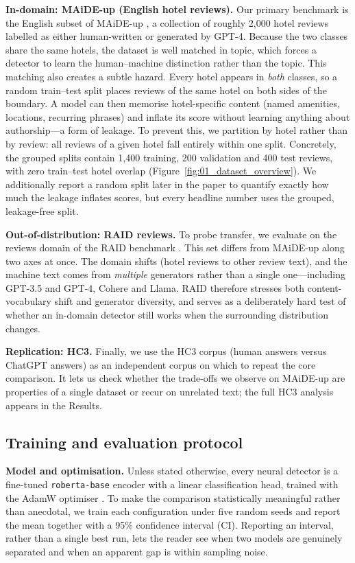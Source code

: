 \documentclass[10pt,twocolumn]{article}
\begin{document}
\textbf{In-domain: MAiDE-up (English hotel reviews).} Our primary benchmark is the English subset of MAiDE-up \cite{maideup}, a collection of roughly 2{,}000 hotel reviews labelled as either human-written or generated by GPT-4. Because the two classes share the same hotels, the dataset is well matched in topic, which forces a detector to learn the human--machine distinction rather than the topic. This matching also creates a subtle hazard. Every hotel appears in \emph{both} classes, so a random train--test split places reviews of the same hotel on both sides of the boundary. A model can then memorise hotel-specific content (named amenities, locations, recurring phrases) and inflate its score without learning anything about authorship---a form of leakage. To prevent this, we partition by hotel rather than by review: all reviews of a given hotel fall entirely within one split. Concretely, the grouped splits contain 1{,}400 training, 200 validation and 400 test reviews, with zero train--test hotel overlap (Figure~\ref{fig:01_dataset_overview}). We additionally report a random split later in the paper to quantify exactly how much the leakage inflates scores, but every headline number uses the grouped, leakage-free split.

\textbf{Out-of-distribution: RAID reviews.} To probe transfer, we evaluate on the reviews domain of the RAID benchmark \cite{raid}. This set differs from MAiDE-up along two axes at once. The domain shifts (hotel reviews to other review text), and the machine text comes from \emph{multiple} generators rather than a single one---including GPT-3.5 and GPT-4, Cohere and Llama. RAID therefore stresses both content-vocabulary shift and generator diversity, and serves as a deliberately hard test of whether an in-domain detector still works when the surrounding distribution changes.

\textbf{Replication: HC3.} Finally, we use the HC3 corpus (human answers versus ChatGPT answers) as an independent corpus on which to repeat the core comparison. It lets us check whether the trade-offs we observe on MAiDE-up are properties of a single dataset or recur on unrelated text; the full HC3 analysis appears in the Results.

\subsection{Training and evaluation protocol}
\textbf{Model and optimisation.} Unless stated otherwise, every neural detector is a fine-tuned \texttt{roberta-base} encoder \cite{roberta} with a linear classification head, trained with the AdamW optimiser \cite{adamw}. To make the comparison statistically meaningful rather than anecdotal, we train each configuration under five random seeds and report the mean together with a 95\% confidence interval (CI). Reporting an interval, rather than a single best run, lets the reader see when two models are genuinely separated and when an apparent gap is within sampling noise.
\end{document}
